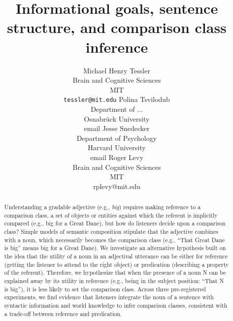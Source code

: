 \documentclass[10pt,letterpaper]{article}
\title{Informational goals, sentence structure, and comparison class inference}
\author{Michael Henry Tessler  \\  Brain and Cognitive Sciences \\   MIT  \\  \texttt{tessler@mit.edu}
         \And  
         Polina Tsvilodub  \\ Department of ... \\   Osnabrück University  \\  email
          \And
         Jesse Snedecker  \\ Department of Psychology \\   Harvard University  \\  email
                   \And
         Roger Levy \\ Brain and Cognitive Sciences \\   MIT  \\  rplevy@mit.edu}
\begin{document}
\maketitle

\begin{abstract}
   
Understanding a gradable adjective (e.g., \emph{big}) requires making reference to a comparison class, a set of objects or entities against which the referent is implicitly compared (e.g., big for a Great Dane), but how do listeners decide upon a comparison class? Simple models of semantic composition stipulate that the adjective combines with a noun, which necessarily becomes the comparison class (e.g., ``That Great Dane is big'' means big for a Great Dane). We investigate an alternative hypothesis built on the idea that the utility of a noun in an adjectival utterance can be either for reference (getting the listener to attend to the right object) or predication (describing a property of the referent). Therefore, we hypothesize that when the presence of a noun N can be explained away by its utility in reference (e.g., being in the subject position: ``That N is big''), it is less likely to set the comparison class. Across three pre-registered experiments, we find evidence that listeners integrate the noun of a sentence with syntactic information and world knowledge to infer comparison classes, consistent with a trade-off between reference and predication. 
 
   
   
\end{abstract}
\end{document}
